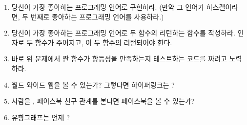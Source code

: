 \begin{enumerate}
\tightlist
\item
  당신이 가장 좋아하는 프로그래밍 언어로  구현하라.
  (만약 그 언어가 하스켈이라면, 두 번째로 좋아하는 프로그래밍 언어를 사용하라.)
\item
  당신이 가장 좋아하는 프로그래밍 언어로 두 함수의  리턴하는 함수를 작성하라.
  인자로 두 함수가 주어지고, 이 두 함수의  리턴되어야 한다.  
\item
  바로 위 문제에서 짠 함수가 항등성을 만족하는지 테스트하는 코드를 짜려고 노력하라.
\item
  월드 와이드 웹을  볼 수 있는가? 그렇다면 하이퍼링크는 ?
\item
  사람을 \trObject, 페이스북 친구 관계를  본다면
  페이스북을  볼 수 있는가?
\item
  유향그래프는 언제 ?
\end{enumerate}
